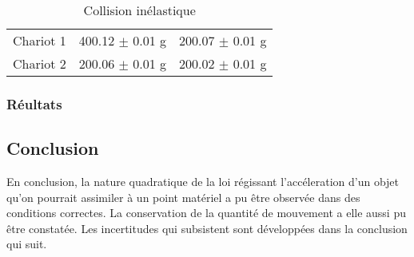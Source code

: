 \begin{table}[h]
    \centering
    \caption{Collision inélastique}
    \begin{tabular}{|l|l|l|}
	\hline
	Chariot 1 & 400.12 $\pm$ 0.01 g & 200.07 $\pm$ 0.01 g \\
	Chariot 2 & 200.06 $\pm$ 0.01 g & 200.02 $\pm$ 0.01 g \\
	\hline
    \end{tabular}
\end{table}


\subsubsection{Réultats}


\subsection{Conclusion}
En conclusion, la nature quadratique de la loi régissant l'accéleration d'un objet qu'on pourrait assimiler à un point matériel a pu être observée dans des conditions correctes.
La conservation de la quantité de mouvement a elle aussi pu être constatée. Les incertitudes qui subsistent sont développées dans la conclusion qui suit.
